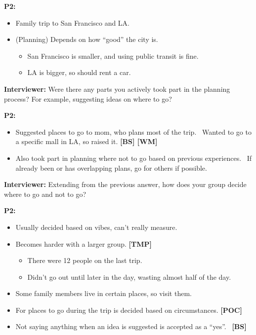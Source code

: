 \documentclass[12pt,a4paper]{article}
\begin{document}
\textbf{P2:}

\begin{itemize}
    \item Family trip to San Francisco and LA.
    \item (Planning) Depends on how “good” the city is.
    \begin{itemize}
        \item San Francisco is smaller, and using public transit is fine. 
        \item LA is bigger, so should rent a car. 
    \end{itemize}
\end{itemize}

\textbf{Interviewer: }Were there any parts you actively took part in the planning process? For example, suggesting ideas on where to go? 

\textbf{P2: }

\begin{itemize}
    \item Suggested places to go to mom, who plans most of the trip. 
Wanted to go to a specific mall in LA, so raised it. \textbf{[BS] [WM]}

    \item Also took part in planning where not to go based on previous experiences. 
If already been or has overlapping plans, go for others if possible. 

\end{itemize}
\textbf{Interviewer: }Extending from the previous answer, how does your group decide where to go and not to go? 

\textbf{P2: }

\begin{itemize}
    \item Usually decided based on vibes, can’t really measure.
    \item Becomes harder with a larger group. \textbf{[TMP]}
    \begin{itemize}
        \item There were 12 people on the last trip. 
        \item Didn’t go out until later in the day, wasting almost half of the day. 
    \end{itemize}
    \item Some family members live in certain places, so visit them.
    \item For places to go during the trip is decided based on circumstances. \textbf{[POC]}
    \item Not saying anything when an idea is suggested is accepted as a “yes”.  \textbf{[BS]}
\end{itemize}
\end{document}
